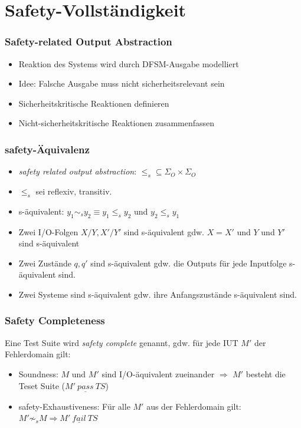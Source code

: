 \documentclass[10pt]{beamer}
\begin{document}
\section{Safety-Vollständigkeit}
\begin{frame}
\frametitle{Safety-related Output Abstraction}
\begin{itemize}
  \item<1-> Reaktion des Systems wird durch DFSM-Ausgabe modelliert
  \item<2-> Idee: Falsche Ausgabe muss nicht sicherheitsrelevant sein
  \item<3-> Sicherheitskritische Reaktionen definieren
  \item<4-> Nicht-sicherheitskritische Reaktionen zusammenfassen
\end{itemize}
\end{frame}

\begin{frame}
\frametitle{safety-Äquivalenz}
\begin{itemize}
  \item<1-> \emph{safety related output abstraction}: $\leq_s \subseteq \Sigma_O \times \Sigma_O$
  \item<2-> $\leq_s$ sei reflexiv, transitiv.
  \item<3-> s-äquivalent: $y_1 \sim_s y_2 \equiv y_1 \leq_s y_2$ und $y_2 \leq_s y_1$
  \item<4-> Zwei I/O-Folgen $X/Y, X'/Y'$ sind s-äquivalent gdw. $X=X'$ und $Y$ und $Y'$ sind s-äquivalent
  \item<5-> Zwei Zustände $q, q'$ sind s-äquivalent gdw. die Outputs für jede Inputfolge s-äquivalent sind.
  \item<6-> Zwei Systeme sind s-äquivalent gdw. ihre Anfangszustände s-äquivalent sind.
\end{itemize}
\end{frame}

\begin{frame}
\frametitle{Safety Completeness}
Eine Test Suite wird \emph{safety complete} genannt, gdw. für jede IUT $M'$ der Fehlerdomain gilt:
\begin{itemize}
  \item<1-> Soundness: $M$ und $M'$ sind I/O-äquivalent zueinander $\Rightarrow$ $M'$ besteht die Teset Suite ($M'~ \underline{pass}~ TS$)
  \item<2-> safety-Exhaustiveness: Für alle $M'$ aus der Fehlerdomain gilt: $M' \not \sim_s M \Rightarrow M'~ \underline{fail}~ TS$
\end{itemize}
\end{frame}
\end{document}
